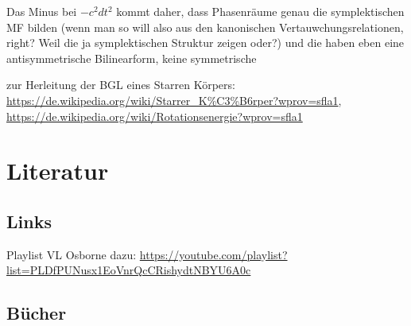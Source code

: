 Das Minus bei $-c^2dt^2$ kommt daher, dass Phasenräume genau die symplektischen MF bilden (wenn man so will also aus den kanonischen Vertauwchungsrelationen, right? Weil die ja symplektischen Struktur zeigen oder?) und die haben eben eine antisymmetrische Bilinearform, keine symmetrische


zur Herleitung der BGL eines Starren Körpers: \url{https://de.wikipedia.org/wiki/Starrer_K%C3%B6rper?wprov=sfla1}, \url{https://de.wikipedia.org/wiki/Rotationsenergie?wprov=sfla1}


	\section{Literatur}
		\subsection{Links}
Playlist VL Osborne dazu: \url{https://youtube.com/playlist?list=PLDfPUNusx1EoVnrQcCRishydtNBYU6A0c}

		\subsection{Bücher}


\printindex

